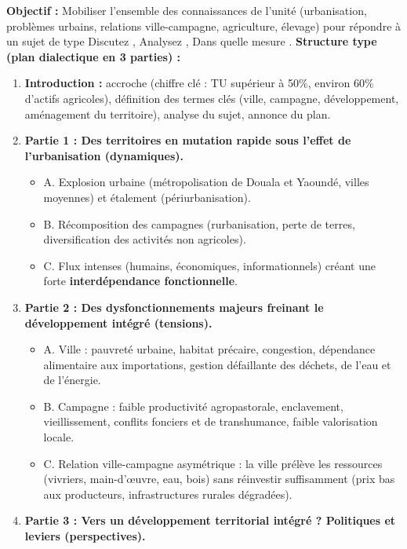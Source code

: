 \documentclass[11pt]{article}
\begin{document}
\begin{methode}
\textbf{Objectif :} Mobiliser l'ensemble des connaissances de l'unité (urbanisation, problèmes urbains, relations ville-campagne, agriculture, élevage) pour répondre à un sujet de type \og Discutez \fg{}, \og Analysez \fg{}, \og Dans quelle mesure \fg{}.
\textbf{Structure type (plan dialectique en 3 parties) :}
\begin{enumerate}
    \item \textbf{Introduction :} accroche (chiffre clé : TU supérieur à 50\%, environ 60\% d'actifs agricoles), définition des termes clés (ville, campagne, développement, aménagement du territoire), analyse du sujet, annonce du plan.
    \item \textbf{Partie 1 : Des territoires en mutation rapide sous l'effet de l'urbanisation (dynamiques).}
        \begin{itemize}
            \item A. Explosion urbaine (métropolisation de Douala et Yaoundé, villes moyennes) et étalement (périurbanisation).
            \item B. Récomposition des campagnes (rurbanisation, perte de terres, diversification des activités non agricoles).
            \item C. Flux intenses (humains, économiques, informationnels) créant une forte \textbf{interdépendance fonctionnelle}.
        \end{itemize}
    \item \textbf{Partie 2 : Des dysfonctionnements majeurs freinant le développement intégré (tensions).}
        \begin{itemize}
            \item A. Ville : pauvreté urbaine, habitat précaire, congestion, dépendance alimentaire aux importations, gestion défaillante des déchets, de l'eau et de l'énergie.
            \item B. Campagne : faible productivité agropastorale, enclavement, vieillissement, conflits fonciers et de transhumance, faible valorisation locale.
            \item C. Relation ville-campagne asymétrique : la ville prélève les ressources (vivriers, main-d'œuvre, eau, bois) sans réinvestir suffisamment (prix bas aux producteurs, infrastructures rurales dégradées).
        \end{itemize}
    \item \textbf{Partie 3 : Vers un développement territorial intégré ? Politiques et leviers (perspectives).}

\end{enumerate}
\end{methode}
\end{document}
